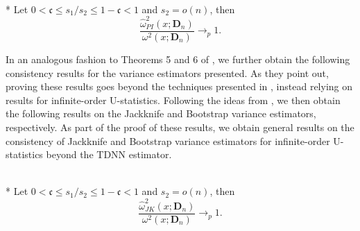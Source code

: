 \begin{boxD}
	\begin{thm}\label{thm:PI_JK_Cons}\mbox{}\\*
		Let $0 < \mathfrak{c} \leq s_1/s_2 \leq 1 - \mathfrak{c} < 1$ and $s_2 = o(n)$, then
		\begin{equation}
			\frac{\hat{\omega}_{PI}^2\left(x; \mathbf{D}_n\right)}{\omega^{2}\left(x; \mathbf{D}_n\right)} \longrightarrow_{p} 1.
		\end{equation}
	\end{thm}
\end{boxD}


In an analogous fashion to Theorems 5 and 6 of \citet{demirkaya_optimal_2024}, we further obtain the following consistency results for the variance estimators presented.
As they point out, proving these results goes beyond the techniques presented in \citet{arvesen_jackknifing_1969}, instead relying on results for infinite-order U-statistics.
Following the ideas from \citet{peng_bias_2021}, we then obtain the following results on the Jackknife and Bootstrap variance estimators, respectively.
As part of the proof of these results, we obtain general results on the consistency of Jackknife and Bootstrap variance estimators for infinite-order U-statistics beyond the TDNN estimator.
\begin{boxD}
	\begin{thm}\label{thm:JK_Cons}\mbox{}\\*
		Let $0 < \mathfrak{c} \leq s_1/s_2 \leq 1 - \mathfrak{c} < 1$ and $s_2 = o(n)$, then
		\begin{equation}
			\frac{\hat{\omega}_{JK}^2\left(x; \mathbf{D}_n\right)}{\omega^{2}\left(x; \mathbf{D}_n\right)} \longrightarrow_{p} 1.
		\end{equation}
	\end{thm}
\end{boxD}

